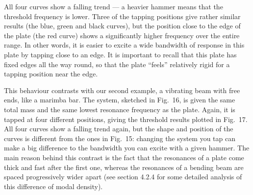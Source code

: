 
  All four curves show a falling trend — a heavier hammer means that the 
  threshold frequency is lower. Three of the tapping positions give rather 
  similar results (the blue, green and black curves), but the position close to 
  the edge of the plate (the red curve) shows a significantly higher frequency 
  over the entire range. In other words, it is easier to excite a wide 
  bandwidth of response in this plate by tapping close to an edge. It is 
  important to recall that this plate has fixed edges all the way round, so 
  that the plate “feels” relatively rigid for a tapping position near the edge. 

  This behaviour contrasts with our second example, a vibrating beam with free 
  ends, like a marimba bar. The system, sketched in Fig.\ 16, is given the same 
  total mass and the same lowest resonance frequency as the plate. Again, it is 
  tapped at four different positions, giving the threshold results plotted in 
  Fig.\ 17. All four curves show a falling trend again, but the shape and 
  position of the curves is different from the ones in Fig.\ 15: changing the 
  system you tap can make a big difference to the bandwidth you can excite with 
  a given hammer. The main reason behind this contrast is the fact that the 
  resonances of a plate come thick and fast after the first one, whereas the 
  resonances of a bending beam are spaced progressively wider apart (see 
  section 4.2.4 for some detailed analysis of this difference of modal 
  density). 



